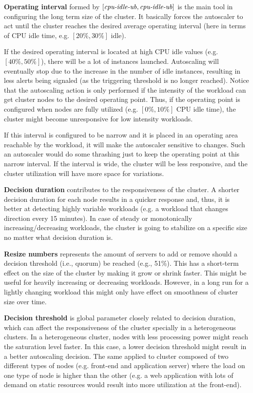 \textbf{Operating interval} formed by $[\text{\textit{cpu-idle-ub}},\text{\textit{cpu-idle-ub}}]$ is the main tool in configuring the long term size of the cluster. 
It basically forces the autoscaler to act until the cluster reaches the desired average operating interval (here in terms of CPU idle time, e.g. $[20\%,30\%]$ idle).

If the desired operating interval is located at high CPU idle values (e.g. $[40\%,50\%]$), there will be a lot of instances launched.
Autoscaling will eventually stop due to the increase in the number of idle instances, resulting in less alerts being signaled (as the triggering threshold is no longer reached). 
Notice that the autoscaling action is only performed if the intensity of the workload can get cluster nodes to the desired operating point. Thus, if 
the operating point is configured when nodes are fully utilized (e.g. $[0\%,10\%]$ CPU idle time), the cluster might become unresponsive for low intensity workloads.

If this interval is configured to be narrow and it is placed in an operating area reachable by the workload, it will make the autoscaler sensitive to changes. Such an autoscaler would do some thrashing just to keep the operating point at this narrow interval. If the interval is wide, the cluster will be less responsive, and the cluster utilization will have more space for variations. 

\textbf{Decision duration} contributes to the responsiveness of the cluster. A shorter decision duration for each node results in a quicker response and, thus, it is better at detecting highly variable workloads (e.g. a workload that changes direction every 15 minutes). 
 In case of steady or monotonically increasing/decreasing workloads, the cluster is going to stabilize on a specific size no matter what decision duration is. 

\textbf{Resize numbers} represents the amount of servers to add or remove should a decision threshold (i.e., quorum) be reached  (e.g., 51\%). 
This has a short-term effect on the size of the cluster by making it grow or shrink faster. This might be useful for heavily increasing or decreasing workloads. However, in a long run for a lightly changing workload this might only have effect on smoothness of cluster size over time. 

\textbf{Decision threshold} is global parameter closely related to decision duration, which can affect the responsiveness of the cluster specially in a heterogeneous clusters.
In a heterogeneous cluster, nodes with less processing power might reach the saturation level faster. In this case, a lower decision threshold might result in a better autoscaling decision. The same applied to cluster composed of two different types of nodes (e.g. front-end and application server) where the load on one type of node is higher than the other (e.g. a web application with lots of demand on static resources would result into more utilization at the front-end). 

